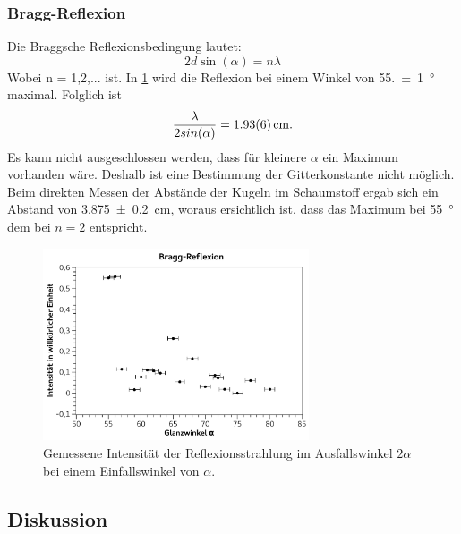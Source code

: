 \documentclass[
	a4paper,
	12pt,
	pagesize,
	ngerman
]{scrartcl}
\begin{document}
	\subsubsection{Bragg-Reflexion}
	Die Braggsche Reflexionsbedingung lautet:
	\begin{equation}
		2d \sin(\alpha) = n \lambda
	\end{equation}
	Wobei n = 1,2,... ist. %
	In \cref{fig_bragg} wird die Reflexion bei einem Winkel von \SI{55,+-1}{\degree} maximal.
	Folglich ist 
	\begin{equation*}
		\frac{\lambda}{2sin(\alpha)} = \SI{1,93+-0,06}{cm}. %
	\end{equation*}
	Es kann nicht ausgeschlossen werden, dass für kleinere $\alpha$ ein Maximum vorhanden wäre.
	Deshalb ist eine Bestimmung der Gitterkonstante nicht möglich.
	Beim direkten Messen der Abstände der Kugeln im Schaumstoff ergab sich ein Abstand von \SI{3,875+-0,2}{cm}, woraus ersichtlich ist, dass das Maximum bei \SI{55}{\degree} dem bei $n=2$ entspricht. %
	\begin{figure}[H]
		\includegraphics[width=0.7\textwidth]{fig_bragg}
		\centering
		\caption{Gemessene Intensität der Reflexionsstrahlung im Ausfallswinkel $2\alpha$ bei einem Einfallswinkel von $\alpha$.}
		\label{fig_bragg}
		\centering
	\end{figure}
	\subsection{Diskussion}
	
\end{document}
